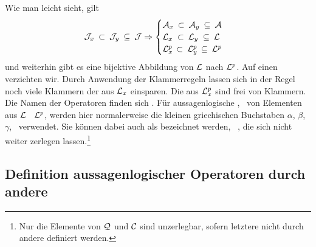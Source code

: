 Wie man leicht sieht, gilt
\begin{equation}
	\mathcal{J}_x     \: \subset \: \mathcal{J}_y \: \subseteq \: \mathcal{J} \Rightarrow
	\begin{cases}
		\mathcal{A}_x \: \subset \: \mathcal{A}_y \: \subseteq \: \mathcal{A} \\
		\mathcal{L}_x \; \subset \: \mathcal{L}_y \; \subseteq \: \mathcal{L} \\
		\mathcal{L}_x^p\, \subset \: \mathcal{L}_y^p\, \subseteq \: \mathcal{L}^p
	\end{cases}
\end{equation}
und weiterhin gibt es eine bijektive Abbildung von $\mathcal{L}$ nach $\mathcal{L}^p$. Auf einen  verzichten wir.
%
Durch Anwendung der Klammerregeln  lassen sich in der Regel noch viele Klammern der  aus $\mathcal{L}_x$ einsparen.
Die  aus $\mathcal{L}_x^p$ sind frei von Klammern.
Die Namen der Operatoren finden sich .
Für aussagenlogische , \textdh\ von Elementen aus $\mathcal{L}$ \textbzgl\ $\mathcal{L}^p$, werden hier normalerweise die kleinen griechischen Buchstaben $\alpha$, $\beta$, $\gamma$, \textusw\ verwendet.
Sie können dabei auch als \emph{} bezeichnet werden, \textdh\ , die sich nicht weiter zerlegen lassen.\footnote{%
	Nur die Elemente von $\mathcal{Q}$ und $\mathcal{C}$ sind unzerlegbar, sofern letztere nicht durch andere  definiert werden.%
}

\subsection{Definition aussagenlogischer Operatoren durch andere}%
\label{sub:ausOperatorDef}

